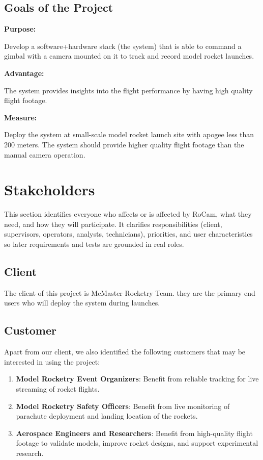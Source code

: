 \documentclass[12pt]{article}
\begin{document}
\subsection{Goals of the Project}

\textbf{Purpose:}

Develop a software+hardware stack (the system) that is able to command a gimbal
with a camera mounted on it to track and record model rocket launches.

\textbf{Advantage:}

The system provides insights into the flight performance by having high quality
flight footage.

\textbf{Measure:}

Deploy the system at small-scale model rocket launch site with apogee less than
200 meters. The system should provide higher quality flight footage than the
manual camera operation.

\section{Stakeholders}
This section identifies everyone who affects or is affected by RoCam, what they
need, and how they will participate. It clarifies responsibilities (client,
supervisors, operators, analysts, technicians), priorities, and user
characteristics so later requirements and tests are grounded in real roles.

\subsection{Client}

The client of this project is McMaster Rocketry Team. they are the primary end
users who will deploy the system during launches.

\subsection{Customer}

Apart from our client, we also identified the following customers that may be
interested in using the project:

\begin{enumerate}
  \item \textbf{Model Rocketry Event Organizers}: Benefit from
        reliable tracking for live streaming of rocket flights.
  \item \textbf{Model Rocketry Safety Officers}: Benefit from
        live monitoring of parachute deployment and landing location
        of the rockets.
  \item \textbf{Aerospace Engineers and Researchers}: Benefit from
        high-quality flight footage to validate models, improve rocket
        designs, and support experimental research.
\end{enumerate}
\end{document}
